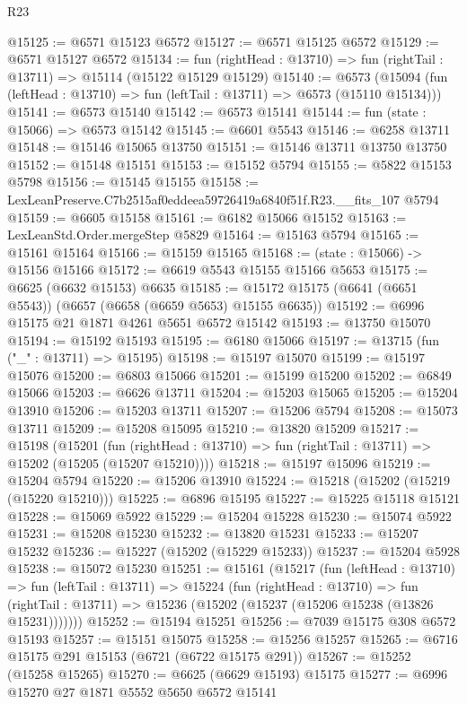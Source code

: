 \begin{lexlean}{R23}
\begin{coremodule}
@15125 := @6571 @15123 @6572
@15127 := @6571 @15125 @6572
@15129 := @6571 @15127 @6572
@15134 := fun (rightHead : @13710) => fun (rightTail : @13711) => @15114 (@15122 @15129 @15129)
@15140 := @6573
    (@15094 (fun (leftHead : @13710) => fun (leftTail : @13711) => @6573 (@15110 @15134)))
@15141 := @6573 @15140
@15142 := @6573 @15141
@15144 := fun (state : @15066) => @6573 @15142
@15145 := @6601 @5543
@15146 := @6258 @13711
@15148 := @15146 @15065 @13750
@15151 := @15146 @13711 @13750 @13750
@15152 := @15148 @15151
@15153 := @15152 @5794
@15155 := @5822 @15153 @5798
@15156 := @15145 @15155
@15158 := LexLeanPreserve.C7b2515af0eddeea59726419a6840f51f.R23.__fits_107 @5794
@15159 := @6605 @15158
@15161 := @6182 @15066 @15152
@15163 := LexLeanStd.Order.mergeStep @5829
@15164 := @15163 @5794
@15165 := @15161 @15164
@15166 := @15159 @15165
@15168 := (state : @15066) -> @15156 @15166
@15172 := @6619 @5543 @15155 @15166 @5653
@15175 := @6625 (@6632 @15153) @6635
@15185 := @15172 @15175 (@6641 (@6651 @5543)) (@6657 (@6658 (@6659 @5653) @15155 @6635))
@15192 := @6996 @15175 @21 @1871 @4261 @5651 @6572 @15142
@15193 := @13750 @15070
@15194 := @15192 @15193
@15195 := @6180 @15066
@15197 := @13715 (fun ("_" : @13711) => @15195)
@15198 := @15197 @15070
@15199 := @15197 @15076
@15200 := @6803 @15066
@15201 := @15199 @15200
@15202 := @6849 @15066
@15203 := @6626 @13711
@15204 := @15203 @15065
@15205 := @15204 @13910
@15206 := @15203 @13711
@15207 := @15206 @5794
@15208 := @15073 @13711
@15209 := @15208 @15095
@15210 := @13820 @15209
@15217 := @15198
    (@15201
      (fun (rightHead : @13710) => fun (rightTail : @13711) => @15202 (@15205 (@15207 @15210))))
@15218 := @15197 @15096
@15219 := @15204 @5794
@15220 := @15206 @13910
@15224 := @15218 (@15202 (@15219 (@15220 @15210)))
@15225 := @6896 @15195
@15227 := @15225 @15118 @15121
@15228 := @15069 @5922
@15229 := @15204 @15228
@15230 := @15074 @5922
@15231 := @15208 @15230
@15232 := @13820 @15231
@15233 := @15207 @15232
@15236 := @15227 (@15202 (@15229 @15233))
@15237 := @15204 @5928
@15238 := @15072 @15230
@15251 := @15161
    (@15217
      (fun (leftHead : @13710) =>
      fun (leftTail : @13711) =>
      @15224
        (fun (rightHead : @13710) =>
        fun (rightTail : @13711) => @15236 (@15202 (@15237 (@15206 @15238 (@13826 @15231)))))))
@15252 := @15194 @15251
@15256 := @7039 @15175 @308 @6572 @15193
@15257 := @15151 @15075
@15258 := @15256 @15257
@15265 := @6716 @15175 @291 @15153 (@6721 (@6722 @15175 @291))
@15267 := @15252 (@15258 @15265)
@15270 := @6625 (@6629 @15193) @15175
@15277 := @6996 @15270 @27 @1871 @5552 @5650 @6572 @15141

\end{coremodule}
\end{lexlean}
